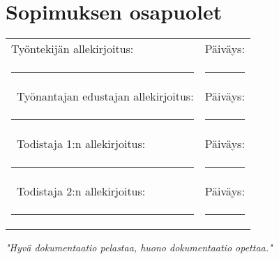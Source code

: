 \documentclass[a4paper,11pt]{article}
\begin{document}
\section*{Sopimuksen osapuolet}

\vspace{2em}
\noindent\begin{tabular}{@{}p{8cm}p{8cm}@{}}
Työntekijän allekirjoitus: & Päiväys: \\
\rule{8cm}{0.4pt} & \rule{8cm}{0.4pt} \\\
Työnantajan edustajan allekirjoitus: & Päiväys: \\
\rule{8cm}{0.4pt} & \rule{8cm}{0.4pt} \\\
Todistaja 1:n allekirjoitus: & Päiväys: \\
\rule{8cm}{0.4pt} & \rule{8cm}{0.4pt} \\\
Todistaja 2:n allekirjoitus: & Päiväys: \\
\rule{8cm}{0.4pt} & \rule{8cm}{0.4pt}
\end{tabular}

\vfill

\begin{center}
    \textit{"Hyvä dokumentaatio pelastaa, huono dokumentaatio opettaa."}
\end{center}
\end{document}
